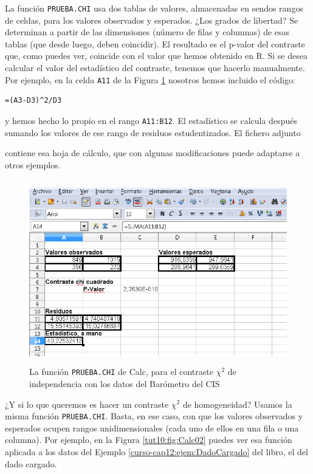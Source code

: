 \documentclass[10pt,a4paper]{article}\usepackage[]{graphicx}\usepackage[]{color}
\newcounter {cont01}
\begin{document}
La función {\tt PRUEBA.CHI} usa dos tablas de valores, almacenadas en sendos rangos de celdas, para los valores observados y esperados. ¿Los grados de libertad? Se determinan a partir de las dimensiones (número de filas y columnas) de esas tablas (que desde luego, deben coincidir).  El resultado es el p-valor del contraste que, como puedes ver, coincide con el valor que hemos obtenido en R. Si se desea calcular el valor del estadístico del contraste, tenemos que hacerlo manualmente. Por ejemplo, en la celda {\tt A11} de la Figura \ref{tut10:fig:Calc01} nosotros hemos incluido el código:
\begin{verbatim}
=(A3-D3)^2/D3
\end{verbatim}
y hemos hecho lo propio en el rango {\tt A11:B12}. El estadístico se calcula después sumando los valores de ese rango de residuos estudentizados. El fichero adjunto
\begin{center}
\end{center}
contiene esa hoja de cálculo, que con algunas modificaciones puede adaptarse a otros ejemplos.

\begin{figure}[t]
\begin{center}
    \includegraphics[height=8cm]{../fig/Tut12-Calc01.png}
\end{center}
\caption{La función {\tt PRUEBA.CHI} de Calc, para el contraste $\chi^2$ de independencia con los datos del Barómetro del CIS}
\label{tut10:fig:Calc01}
\end{figure}


¿Y si lo que queremos es hacer un contraste $\chi^2$ de homogeneidad? Usamos la misma función {\tt PRUEBA.CHI}.  Basta, en ese caso, con que los valores observados y esperados ocupen rangos unidimensionales (cada uno de ellos en una fila o una columna). Por ejemplo, en la Figura \ref{tut10:fig:Calc02} puedes ver esa función aplicada a los datos del Ejemplo \ref{curso-cap12:ejem:DadoCargado} del libro, el del dado cargado.
\end{document}
